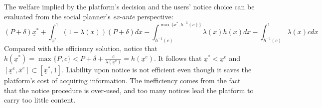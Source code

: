 The welfare implied by the platform's decision and the users' notice choice can be evaluated from the social planner's \emph{ex-ante} perspective:
\begin{equation}
(P+\delta)\underline{x}^*+\int_{\underline{x}^*}^1 (1-\lambda(x))(P+\delta)dx-\int_{h^{-1}(c)}^{\max\{\underline{x}^*,h^{-1}(c)\}}\lambda(x)h(x)dx-\int_{h^{-1}(c)}^{1}\lambda(x)cdx
\end{equation}
Compared with the efficiency solution, notice that $h(\underline{x}^*)=\max\{P,c\}<P+\delta+\frac{c}{\lambda(\underline{x}^e)}=h(\underline{x}^e)$. It follows that $\underline{x}^*<\underline{x}^e$ and $[\underline{x}^e,\overline{x}^e]\subset[\underline{x}^*,1]$. 
Liability upon notice is not efficient even though it saves the platform's cost of acquiring information. 
The inefficiency comes from the fact that the notice procedure is over-used, and too many notices lead the platform to carry too little content.










